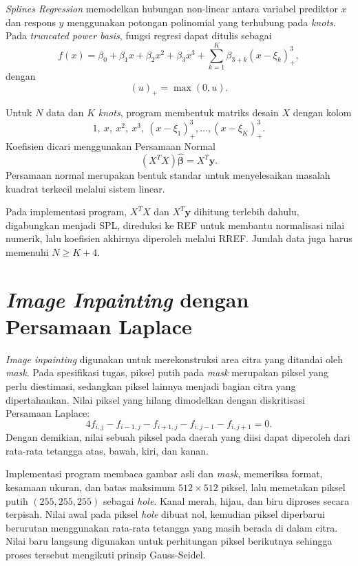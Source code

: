 \documentclass[12pt,a4paper]{report}
\begin{document}
\textit{Splines Regression} memodelkan hubungan non-linear antara variabel prediktor $x$ dan respons $y$ menggunakan potongan polinomial yang terhubung pada \textit{knots}. Pada \textit{truncated power basis}, fungsi regresi dapat ditulis sebagai
\begin{equation*}
f(x)=\beta_0+\beta_1x+\beta_2x^2+\beta_3x^3+
\sum_{k=1}^{K}\beta_{3+k}(x-\xi_k)^3_+,
\end{equation*}
dengan
\begin{equation*}
(u)_+=\max(0,u).
\end{equation*}
\cite{tubes}

Untuk $N$ data dan $K$ \textit{knots}, program membentuk matriks desain $X$ dengan kolom
\begin{equation*}
1,\ x,\ x^2,\ x^3,\ (x-\xi_1)^3_+,\ldots,(x-\xi_K)^3_+.
\end{equation*}
Koefisien dicari menggunakan Persamaan Normal
\begin{equation*}
(X^TX)\hat{\boldsymbol{\beta}}=X^T\mathbf{y}.
\end{equation*}
Persamaan normal merupakan bentuk standar untuk menyelesaikan masalah kuadrat terkecil melalui sistem linear. \cite{tubes,eth-normal}

Pada implementasi program, $X^TX$ dan $X^T\mathbf{y}$ dihitung terlebih dahulu, digabungkan menjadi SPL, direduksi ke REF untuk membantu normalisasi nilai numerik, lalu koefisien akhirnya diperoleh melalui RREF. Jumlah data juga harus memenuhi $N\geq K+4$.

\section{\textit{Image Inpainting} dengan Persamaan Laplace}

\textit{Image inpainting} digunakan untuk merekonstruksi area citra yang ditandai oleh \textit{mask}. Pada spesifikasi tugas, piksel putih pada \textit{mask} merupakan piksel yang perlu diestimasi, sedangkan piksel lainnya menjadi bagian citra yang dipertahankan. Nilai piksel yang hilang dimodelkan dengan diskritisasi Persamaan Laplace:
\begin{equation*}
4f_{i,j}-f_{i-1,j}-f_{i+1,j}-f_{i,j-1}-f_{i,j+1}=0.
\end{equation*}
Dengan demikian, nilai sebuah piksel pada daerah yang diisi dapat diperoleh dari rata-rata tetangga atas, bawah, kiri, dan kanan. \cite{tubes,mathworks-inpainting}

Implementasi program membaca gambar asli dan \textit{mask}, memeriksa format, kesamaan ukuran, dan batas maksimum $512\times512$ piksel, lalu memetakan piksel putih $(255,255,255)$ sebagai \textit{hole}. Kanal merah, hijau, dan biru diproses secara terpisah. Nilai awal pada piksel \textit{hole} dibuat nol, kemudian piksel diperbarui berurutan menggunakan rata-rata tetangga yang masih berada di dalam citra. Nilai baru langsung digunakan untuk perhitungan piksel berikutnya sehingga proses tersebut mengikuti prinsip Gauss-Seidel. \cite{pakrin-iteratif}
\end{document}

